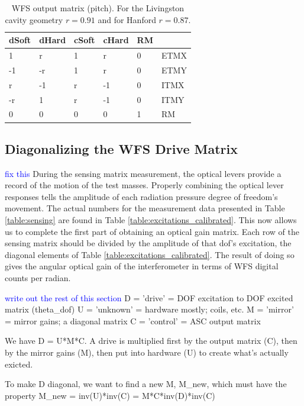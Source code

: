 \begin{table}
\centering
\caption[WFS output matrix]{WFS output matrix (pitch). For the Livingston cavity geometry
  $r=0.91$ and for Hanford $r=0.87$.}
\begin{tabular}{l l l l l l}
\hline 
dSoft & dHard & cSoft & cHard & RM & \\
\hline 
1 & r & 1 & r & 0 & ETMX\\
-1 & -r & 1 & r & 0 & ETMY \\
r & -1 & r & -1 & 0 & ITMX\\
-r & 1 & r & -1 & 0 & ITMY\\
 0 & 0 & 0 & 0 & 1 & RM\\
\hline
\end{tabular}
\label{table:output}
\end{table}


\subsection{Diagonalizing the WFS Drive Matrix}

\textcolor{blue}{fix this} During the sensing matrix measurement, the optical levers provide a
record of the motion of the test masses. Properly combining the
optical lever responses tells the amplitude of each radiation pressure
degree of freedom's movement. The actual numbers for the measurement
data presented in Table \ref{table:sensing} are found in Table
\ref{table:excitations_calibrated}. This now allows us to complete the
first part of obtaining an optical gain matrix. Each row of the
sensing matrix should be divided by the amplitude of that dof's
excitation, the diagonal elements of Table
\ref{table:excitations_calibrated}. The result of doing so gives the
angular optical gain of the interferometer in terms of WFS digital
counts per radian.


\textcolor{blue}{write out the rest of this section}
D = 'drive' = DOF excitation to DOF excited matrix (theta\_dof)
U = 'unknown' = hardware mostly; coils, etc.
M = 'mirror' = mirror gains; a diagonal matrix
C = 'control' = ASC output matrix

We have D = U*M*C. A drive is multiplied first by the output matrix (C),
then by the mirror gains (M), then put into hardware (U) to create what's
actually exicted.

To make D diagonal, we want to find a new M, M\_new, which must have the
property M\_new = inv(U)*inv(C) = M*C*inv(D)*inv(C)


